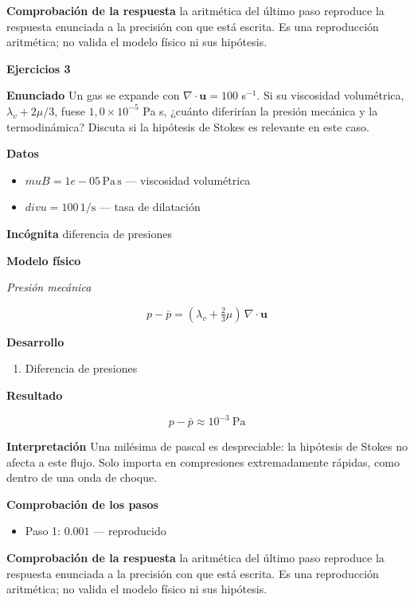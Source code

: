 \documentclass[10pt,openany]{book}
\begin{document}
\noindent\textbf{Comprobación de la respuesta} la aritmética del último paso reproduce la respuesta enunciada a la precisión con que está escrita. Es una reproducción aritmética; no valida el modelo físico ni sus hipótesis.

\noindent\textbf{Ejercicios 3}

\noindent\textbf{Enunciado}
Un gas se expande con \(\nabla\cdot\mathbf{u} = 100\) s\(^{-1}\). Si su viscosidad volumétrica, \(\lambda_v + 2\mu/3\), fuese \(1{,}0\times 10^{-5}\) Pa s, ¿cuánto diferirían la presión mecánica y la termodinámica? Discuta si la hipótesis de Stokes es relevante en este caso.

\noindent\textbf{Datos}
\begin{itemize}
\item $muB = 1e-05\,\mathrm{Pa}\,\mathrm{s}$ — viscosidad volumétrica
\item $divu = 100\,\mathrm{1/s}$ — tasa de dilatación
\end{itemize}

\noindent\textbf{Incógnita}
diferencia de presiones

\noindent\textbf{Modelo físico}

\noindent\textit{Presión mecánica}

\[
p - \bar p = (\lambda_v + \tfrac23\mu)\,\nabla\cdot\mathbf{u}
\]

\noindent\textbf{Desarrollo}
\begin{enumerate}
\item
Diferencia de presiones
\end{enumerate}

\noindent\textbf{Resultado}

\[
p - \bar p \approx 10^{-3}\ \mathrm{Pa}
\]

\noindent\textbf{Interpretación}
Una milésima de pascal es despreciable: la hipótesis de Stokes no afecta a este flujo. Solo importa en compresiones extremadamente rápidas, como dentro de una onda de choque.

\noindent\textbf{Comprobación de los pasos}
\begin{itemize}
\item Paso 1: $0.001$ — reproducido
\end{itemize}

\noindent\textbf{Comprobación de la respuesta} la aritmética del último paso reproduce la respuesta enunciada a la precisión con que está escrita. Es una reproducción aritmética; no valida el modelo físico ni sus hipótesis.
\end{document}
